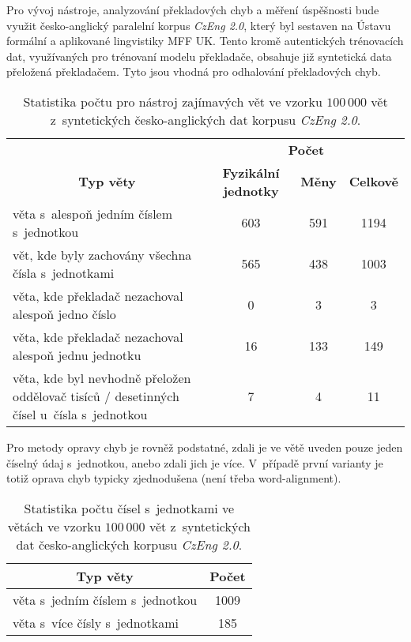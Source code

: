 \documentclass[12pt,a4paper]{article}
\begin{document}
	Pro vývoj nástroje, analyzování překladových chyb a měření úspěšnosti bude využit česko-anglický paralelní korpus \textit{CzEng 2.0}\autocite{kocmi2020announcing}, který byl sestaven na Ústavu formální a aplikované lingvistiky MFF UK. Tento kromě autentických trénovacích dat, využívaných pro trénovaní modelu překladače, obsahuje již syntetická data přeložená překladačem. Tyto jsou vhodná pro odhalování překladových chyb.
		
	\begin{table}[htb]
		\caption{Statistika počtu pro nástroj zajímavých vět ve vzorku $100\,000$ vět z~syntetických česko-anglických dat korpusu \textit{CzEng 2.0}.}
		\label{tab:stats}
		\begin{tabularx}{\textwidth}{Xccc}
			\multicolumn{1}{c}{\textbf{}} & \multicolumn{3}{c}{\textbf{Počet}} \\
			\multicolumn{1}{c}{\textbf{Typ věty}} & \textbf{Fyzikální jednotky} & \textbf{Měny} & \textbf{Celkově} \\ \hline \hline
			věta s~alespoň jedním číslem s~jednotkou & 603 & 591 & 1194 \\
			vět, kde byly zachovány všechna čísla s~jednotkami & 565 & 438 & 1003 \\
			věta, kde překladač nezachoval alespoň jedno číslo & 0 & 3 & 3 \\
			věta, kde překladač nezachoval alespoň jednu jednotku & 16 & 133 & 149 \\
			věta, kde byl nevhodně přeložen oddělovač tisíců / desetinných čísel u~čísla s~jednotkou & 7 & 4 & 11
		\end{tabularx}
	\end{table}

	Pro metody opravy chyb je rovněž podstatné, zdali je ve větě uveden pouze jeden číselný údaj s~jednotkou, anebo zdali jich je více. V~případě první varianty je totiž oprava chyb typicky zjednodušena (není třeba word-alignment).
	
	\begin{table}[htb]
		\caption{Statistika počtu čísel s~jednotkami ve větách ve vzorku $100\,000$ vět z~syntetických dat česko-anglických korpusu \textit{CzEng 2.0}.}
		\begin{tabularx}{\textwidth}{Xc}
			\multicolumn{1}{c}{\textbf{Typ věty}} & \textbf{Počet} \\ \hline \hline
			věta s~jedním číslem s~jednotkou & 1009 \\
			věta s~více čísly s~jednotkami & 185
		\end{tabularx}
	\end{table}
	
\end{document}
